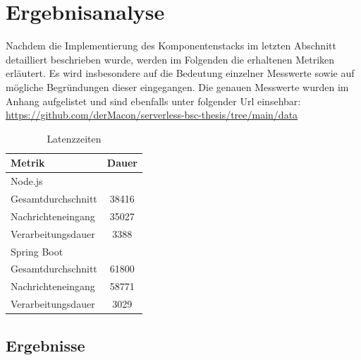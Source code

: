\chapter{Ergebnisanalyse}
\label{ch:ergebnisanalyse}


Nachdem die Implementierung des Komponentenstacks im letzten Abschnitt detailliert beschrieben wurde, werden im Folgenden die erhaltenen Metriken erläutert. Es wird insbesondere auf die Bedeutung einzelner Messwerte sowie auf mögliche Begründungen dieser eingegangen. Die genauen Messwerte wurden im Anhang aufgelistet und sind ebenfalls unter folgender Url einsehbar: \url{https://github.com/derMacon/serverless-bsc-thesis/tree/main/data} 

\label{tab:latency}
\begin{table}[ht!]
  \vspace{-8mm}
  \centering
  \hspace{1cm}
  \begin{tabular}{@{}lc@{}}
    \toprule
    Metrik & Dauer \\
    \midrule
    Node.js \\
    \hspace{3mm}Gesamtdurchschnitt & 38416 \\
    \hspace{3mm}Nachrichteneingang & 35027 \\
    \hspace{3mm}Verarbeitungsdauer & 3388 \\
    \midrule
    Spring Boot \\
    \hspace{3mm}Gesamtdurchschnitt & 61800 \\
    \hspace{3mm}Nachrichteneingang & 58771 \\
    \hspace{3mm}Verarbeitungsdauer & 3029 \\
    \bottomrule
  \end{tabular}
  \caption[Latenzzeit - Vergleich]{Latenzzeiten}
\end{table} 


\section{Ergebnisse}


